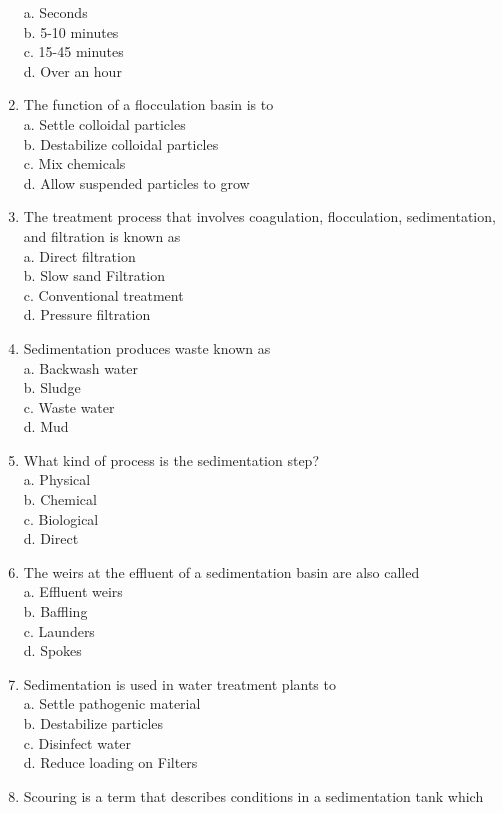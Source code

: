\begin{enumerate}
a. Seconds\\
b. 5-10 minutes\\
c. 15-45 minutes\\
d. Over an hour\\
\item The function of a flocculation basin is to\\
a. Settle colloidal particles\\
b. Destabilize colloidal particles\\
c. Mix chemicals\\
d. Allow suspended particles to grow\\
\item The treatment process that involves coagulation, flocculation, sedimentation, and filtration is known as\\
a. Direct filtration\\
b. Slow sand Filtration\\
c. Conventional treatment\\
d. Pressure filtration\\
\item Sedimentation produces waste known as\\
a. Backwash water\\
b. Sludge\\
c. Waste water\\
d. Mud\\
\item What kind of process is the sedimentation step?\\
a. Physical\\
b. Chemical\\
c. Biological\\
d. Direct\\
\item The weirs at the effluent of a sedimentation basin are also called\\
a. Effluent weirs\\
b. Baffling\\
c. Launders\\
d. Spokes\\
\item Sedimentation is used in water treatment plants to\\
a. Settle pathogenic material\\
b. Destabilize particles\\
c. Disinfect water\\
d. Reduce loading on Filters\\
\item Scouring is a term that describes conditions in a sedimentation tank which\\

\end{enumerate}

